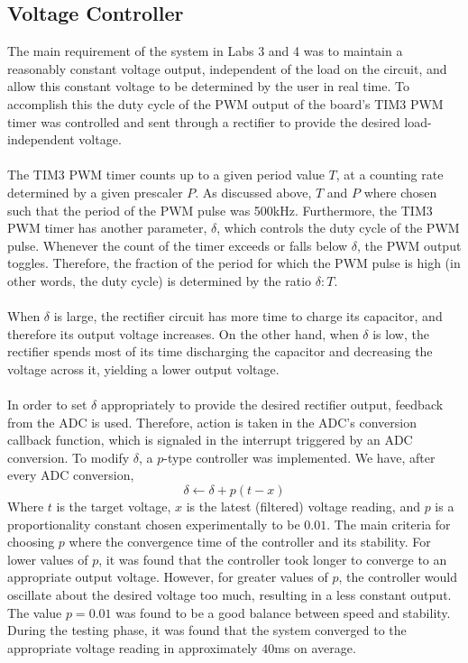 \documentclass[12pt]{report}
\begin{document}
\subsection{Voltage Controller}
The main requirement of the system in Labs 3 and 4 was to maintain a reasonably constant voltage
output, independent of the load on the circuit, and allow this constant voltage to be determined by
the user in real time. To accomplish this the duty cycle of the PWM output of the board's TIM3 PWM
timer was controlled and sent through a rectifier to provide the desired load-independent
voltage.\\\\
The TIM3 PWM timer counts up to a given period value $T$, at a counting rate determined by a given
prescaler $P$. As discussed above, $T$ and $P$ where chosen such that the period of the PWM pulse
was 500kHz. Furthermore, the TIM3 PWM timer has another parameter, $\delta$, which controls the duty
cycle of the PWM pulse. Whenever the count of the timer exceeds or falls below $\delta$, the PWM
output toggles. Therefore, the fraction of the period for which the PWM pulse is high (in other
words, the duty cycle) is determined by the ratio $\delta:T$.\\\\
When $\delta$ is large, the rectifier circuit has more time to charge its capacitor, and therefore
its output voltage increases. On the other hand, when $\delta$ is low, the rectifier spends most of
its time discharging the capacitor and decreasing the voltage across it, yielding a lower output
voltage.\\\\
In order to set $\delta$ appropriately to provide the desired rectifier output, feedback from the
ADC is used. Therefore, action is taken in the ADC's conversion callback function, which is
signaled in the interrupt triggered by an ADC conversion. To modify $\delta$, a $p$-type controller
was implemented. We have, after every ADC conversion,
\begin{equation}
	\delta\leftarrow \delta + p(t - x)
\end{equation}
Where $t$ is the target voltage, $x$ is the latest (filtered) voltage reading, and $p$ is a
proportionality constant chosen experimentally to be $0.01$. The main criteria for choosing $p$
where the convergence time of the controller and its stability. For lower values of $p$, it was
found that the controller took longer to converge to an appropriate output voltage. However, for
greater values of $p$, the controller would oscillate about the desired voltage too much, resulting
in a less constant output. The value $p=0.01$ was found to be a good balance between speed and
stability. During the testing phase, it was found that the system converged to the appropriate
voltage reading in approximately $40$ms on average.
\end{document}
